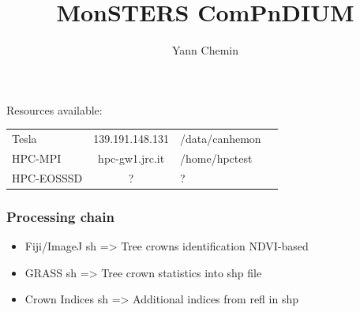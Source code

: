 \documentclass[serif,mathserif,aspectratio=169]{beamer}
\title[JRC\hspace{2em}\insertframenumber/\inserttotalframenumber]{MonSTERS ComPnDIUM}
\author[Yann Chemin]{Yann Chemin }
\institute{JRC}
\date{} %
\begin{document}
{
\begin{frame}[plain]
\titlepage
\end{frame}}

\Large


\begin{frame}
 Resources available:
  
\begin{table}
\begin{tabular}{lclc}
 Tesla & 139.191.148.131 & /data/canhemon\\
 HPC-MPI & hpc-gw1.jrc.it & /home/hpctest\\
 HPC-EOSSSD & ? & ?\\
 \end{tabular}
\end{table}

\end{frame}


\begin{frame}
  \frametitle{Processing chain}
\begin{center}
\begin{itemize}
 \item Fiji/ImageJ sh => Tree crowns identification NDVI-based
 \item GRASS sh => Tree crown statistics into shp file
 \item Crown Indices sh => Additional indices from refl in shp
\end{itemize}
\end{center}
\end{frame}
\end{document}
